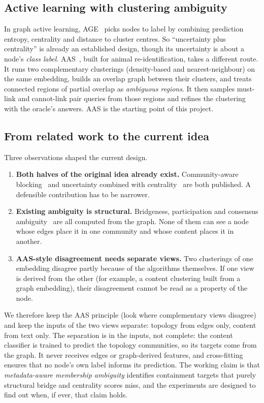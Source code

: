 \subsection{Active learning with clustering ambiguity}
In graph active learning, AGE~\citep{cai2017age} picks nodes to label by combining
prediction entropy, centrality and distance to cluster centres. So ``uncertainty plus
centrality'' is already an established design, though its uncertainty is about a
node's \emph{class label}. AAS~\citep{sani2026aas}, built for animal
re-identification, takes a different route. It runs two complementary clusterings
(density-based and nearest-neighbour) on the same embedding, builds an overlap graph
between their clusters, and treats connected regions of partial overlap as
\emph{ambiguous regions}. It then samples must-link and cannot-link pair queries from
those regions and refines the clustering with the oracle's answers. AAS is the
starting point of this project.

\subsection{From related work to the current idea}
\label{sec:related-gap}
Three observations shaped the current design.
\begin{enumerate}
  \item \textbf{Both halves of the original idea already exist.} Community-aware
        blocking~\citep{ghoshal2021community} and uncertainty combined with
        centrality~\citep{cai2017age} are both published. A defensible contribution has
        to be narrower.
  \item \textbf{Existing ambiguity is structural.} Bridgeness, participation and
        consensus ambiguity~\citep{nepusz2008fuzzy,guimera2005functional,riolo2020consistency}
        are all computed from the graph. None of them can see a node whose edges place
        it in one community and whose content places it in another.
  \item \textbf{AAS-style disagreement needs separate views.} Two clusterings of
        one embedding disagree partly because of the algorithms themselves. If one
        view is derived from the other (for example, a content clustering built from a
        graph embedding), their disagreement cannot be read as a property of the node.
\end{enumerate}
We therefore keep the AAS principle (look where complementary views disagree) and
keep the inputs of the two views separate: topology from edges only, content from text
only. The separation is in the inputs, not complete: the content classifier is trained
to predict the topology communities, so its targets come from the graph. It never
receives edges or graph-derived features, and cross-fitting ensures that no node's own
label informs its prediction. The working claim is that \emph{metadata-aware membership ambiguity}
identifies containment targets that purely structural bridge and centrality scores
miss, and the experiments are designed to find out when, if ever, that claim holds.
